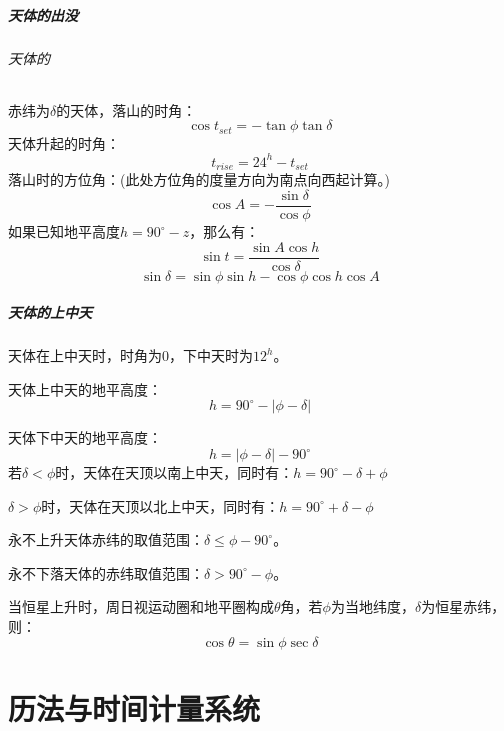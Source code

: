 \paragraph{天体的出没}
\subparagraph{天体的}
赤纬为$\delta$的天体，落山的时角：
\begin{equation}
	\cos t_{set} =-\tan \phi \tan \delta 
\end{equation}
天体升起的时角：
\begin{equation}
	t_{rise}=24^h-t_{set}
\end{equation}
落山时的方位角：(此处方位角的度量方向为南点向西起计算。)
\begin{equation}
	\cos A = -\frac{\sin \delta }{\cos \phi}
\end{equation}
如果已知地平高度$h=90^\circ -z$，那么有：
\begin{equation}
	\sin t =\frac{\sin A\cos h}{\cos \delta }
\end{equation}
\begin{equation}
	\sin \delta=\sin\phi \sin h-\cos \phi \cos h\cos A 
\end{equation}

\paragraph{天体的上中天}
天体在上中天时，时角为0，下中天时为$12^h$。

天体上中天的地平高度：
\begin{equation}
	h=90^\circ -\lvert \phi -\delta \rvert
\end{equation}

天体下中天的地平高度：
\begin{equation}
	h=\lvert\phi -\delta \rvert -90^\circ
\end{equation}
\noindent 若$\delta<\phi$时，天体在天顶以南上中天，同时有：$h=90^\circ-\delta +\phi$

\noindent $\delta >\phi$时，天体在天顶以北上中天，同时有：$h=90^\circ +\delta -\phi$

永不上升天体赤纬的取值范围：$\delta \leq \phi -90^\circ$。

永不下落天体的赤纬取值范围：$\delta > 90^\circ -\phi$。

当恒星上升时，周日视运动圈和地平圈构成$\theta$角，若$\phi$为当地纬度，$\delta $为恒星赤纬，则：
\begin{equation}
	\cos \theta =\sin \phi \sec \delta 
\end{equation}

\chapter{历法与时间计量系统}
